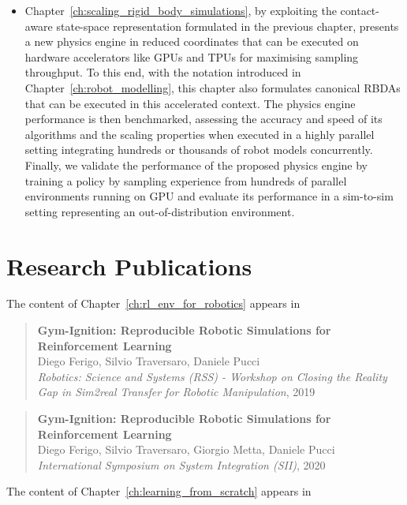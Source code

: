 \begin{itemize}
    \item Chapter~\ref{ch:scaling_rigid_body_simulations}, by exploiting the contact-aware state-space representation formulated in the previous chapter, presents a new physics engine in reduced coordinates that can be executed on hardware accelerators like \acsp{GPU} and \acsp{TPU} for maximising sampling throughput. To this end, with the notation introduced in Chapter~\ref{ch:robot_modelling}, this chapter also formulates canonical \aclp{RBDA} that can be executed in this accelerated context. The physics engine performance is then benchmarked, assessing the accuracy and speed of its algorithms and the scaling properties when executed in a highly parallel setting integrating hundreds or thousands of robot models concurrently. Finally, we validate the performance of the proposed physics engine by training a policy by sampling experience from hundreds of parallel environments running on \ac{GPU} and evaluate its performance in a sim-to-sim setting representing an out-of-distribution environment.
\end{itemize}

\newpage
\section*{Research Publications}

The content of Chapter~\ref{ch:rl_env_for_robotics} appears in

\begin{quote}
    \onehalfspacing
    \textbf{Gym-Ignition: Reproducible Robotic Simulations for Reinforcement Learning} \\[0.75mm]
    Diego Ferigo, Silvio Traversaro, Daniele Pucci \\[0.75mm]
    \textit{Robotics: Science and Systems (RSS) - Workshop on Closing the Reality Gap in Sim2real Transfer for Robotic Manipulation}, 2019
\end{quote}

\begin{quote}
    \onehalfspacing
    \textbf{Gym-Ignition: Reproducible Robotic Simulations for Reinforcement Learning} \\[0.75mm]
    Diego Ferigo, Silvio Traversaro, Giorgio Metta, Daniele Pucci \\[0.75mm]
    \textit{International Symposium on System Integration (SII)}, 2020
\end{quote}

\noindent
The content of Chapter~\ref{ch:learning_from_scratch} appears in

